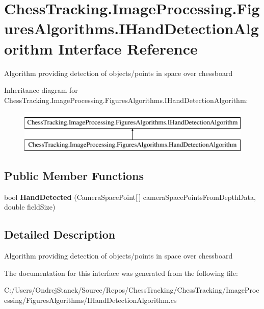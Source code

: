 \hypertarget{interface_chess_tracking_1_1_image_processing_1_1_figures_algorithms_1_1_i_hand_detection_algorithm}{}\section{Chess\+Tracking.\+Image\+Processing.\+Figures\+Algorithms.\+I\+Hand\+Detection\+Algorithm Interface Reference}
\label{interface_chess_tracking_1_1_image_processing_1_1_figures_algorithms_1_1_i_hand_detection_algorithm}


Algorithm providing detection of objects/points in space over chessboard  


Inheritance diagram for Chess\+Tracking.\+Image\+Processing.\+Figures\+Algorithms.\+I\+Hand\+Detection\+Algorithm\+:\begin{figure}[H]
\begin{center}
\leavevmode
\includegraphics[height=2.000000cm]{interface_chess_tracking_1_1_image_processing_1_1_figures_algorithms_1_1_i_hand_detection_algorithm}
\end{center}
\end{figure}
\subsection*{Public Member Functions}
\begin{DoxyCompactItemize}
\item 
\mbox{\label{interface_chess_tracking_1_1_image_processing_1_1_figures_algorithms_1_1_i_hand_detection_algorithm_a19e4eb54c2de026ddf63b0f1174d8517}} 
bool {\bfseries Hand\+Detected} (Camera\+Space\+Point\mbox{[}$\,$\mbox{]} camera\+Space\+Points\+From\+Depth\+Data, double field\+Size)
\end{DoxyCompactItemize}


\subsection{Detailed Description}
Algorithm providing detection of objects/points in space over chessboard 



The documentation for this interface was generated from the following file\+:\begin{DoxyCompactItemize}
\item 
C\+:/\+Users/\+Ondrej\+Stanek/\+Source/\+Repos/\+Chess\+Tracking/\+Chess\+Tracking/\+Image\+Processing/\+Figures\+Algorithms/I\+Hand\+Detection\+Algorithm.\+cs\end{DoxyCompactItemize}
